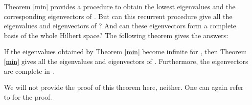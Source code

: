 \documentclass[a4paper,a4paper]{article}
\begin{document}
Theorem \ref{min} provides a procedure to obtain the lowest
eigenvalues and the corresponding eigenvectors of \coordHE{}. But can
this recurrent procedure give all the eigenvalues and eigenvectors
of \coordHE{}? And can these eigenvectors form a complete basis of the
whole Hilbert space? The following theorem gives the answers:
\begin{theorem}\label{inf}
If the eigenvalues \coordHE{} obtained by Theorem \ref{min}
become infinite for \coordHE{}, then Theorem \ref{min}
gives all the eigenvalues and eigenvectors of \coordHE{}. Furthermore,
the eigenvectors \coordHE{} are complete in \coordHE{}.
\end{theorem}
We will not provide the proof of this theorem here, neither. One
can again refer to \cite{Hilbert} for the proof.
\end{document}
